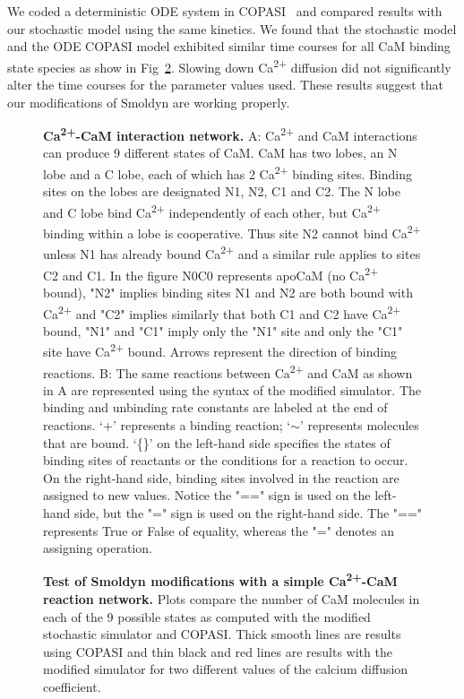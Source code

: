 \documentclass[10pt,letterpaper]{article}
\begin{document}
We coded a deterministic ODE system in COPASI~\cite{Hoops:2006gy} and compared results with our stochastic model using the same kinetics. We found that the stochastic model and the ODE COPASI model exhibited similar time courses for all CaM binding state species as show in Fig~\ref{fig2}. Slowing down Ca\textsuperscript{2+} diffusion did not significantly alter the time courses for the parameter values used. These results suggest that our modifications of Smoldyn are working properly. 

\begin{figure}[!h]
	\caption{{\bf Ca\textsuperscript{2+}-CaM interaction network.}
	A: Ca\textsuperscript{2+} and CaM interactions can produce 9 different states of CaM. CaM has two lobes, an N lobe and a C lobe, each of which has 2 Ca\textsuperscript{2+} binding sites. Binding sites on the lobes are designated N1, N2, C1 and C2. The N lobe and C lobe bind Ca\textsuperscript{2+} independently of each other, but Ca\textsuperscript{2+} binding within a lobe is cooperative. Thus site N2 cannot bind Ca\textsuperscript{2+} unless N1 has already bound Ca\textsuperscript{2+} and a similar rule applies to sites C2 and C1. In the figure N0C0 represents apoCaM (no Ca\textsuperscript{2+} bound), "N2" implies binding sites N1 and N2 are both bound with Ca\textsuperscript{2+} and "C2" implies similarly that both C1 and C2 have Ca\textsuperscript{2+} bound, "N1" and "C1" imply only the "N1" site and only the "C1" site have Ca\textsuperscript{2+} bound. Arrows represent the direction of binding reactions.
	B: The same reactions between Ca\textsuperscript{2+} and CaM as shown in A are represented using the syntax of the modified simulator. The binding and unbinding rate constants are labeled at the end of reactions. ‘+’ represents a binding reaction; ‘$\sim$’ represents molecules that are bound. ‘\{\}’ on the left-hand side specifies the states of binding sites of reactants or the conditions for a reaction to occur. On the right-hand side, binding sites involved in the reaction are assigned to new values. Notice the "==" sign is used on the left-hand side, but the "=" sign is used on the right-hand side. The "==" represents True or False of equality, whereas the "=" denotes an assigning operation. 
	}
\label{fig1}
\end{figure}
	 
\begin{figure}[!h]
	\caption{{\bf Test of Smoldyn modifications with a simple Ca\textsuperscript{2+}-CaM reaction network.}
	Plots compare the number of CaM molecules in each of the 9 possible states as computed with the modified stochastic simulator and COPASI. Thick smooth lines are results using COPASI and thin black and red lines are results with the modified simulator for two different values of the calcium diffusion coefficient.
	}
\label{fig2}
\end{figure}
\end{document}
